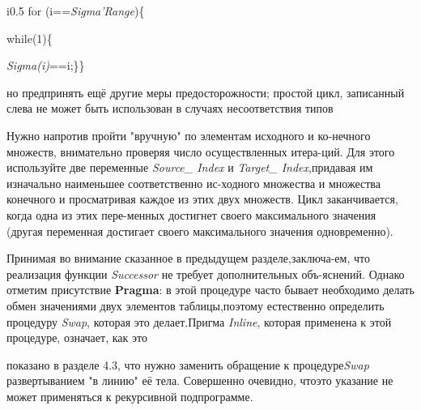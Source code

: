 \begin{wrapfigure}{i}{0.5\textwidth}
for (i==\textit{Sigma'Range})\{

   while(1)\{
   
   \textit{Sigma(i)}==i;\}\}
\end{wrapfigure}

  \noindent но предпринять ещё другие меры предосторожности; простой цикл, записанный слева не может быть использован в случаях несоответствия типов 

Нужно напротив пройти "вручную" по элементам исходного и ко-\linebreak нечного множеств, внимательно проверяя число осуществленных итера-\linebreak ций. Для этого используйте две переменные \textit{Source\_ Index} и \textit{Target\_ Index},\linebreak придавая им изначально наименьшее соответственно ис-\linebreak ходного множества и множества конечного и просматривая каждое из \linebreak этих двух множеств. Цикл заканчивается, когда одна из этих пере-\linebreak менных достигнет своего максимального значения (другая переменная \linebreak достигает своего максимального значения одновременно).\newline 

Принимая во внимание сказанное в предыдущем разделе,заключа-\linebreak ем, что реализация функции \textit{Successor} не требует дополнительных объ-\linebreak яснений. Однако отметим присутствие \textbf{Pragma}: в этой процедуре часто \linebreak бывает необходимо делать обмен значениями двух элементов таблицы,\linebreak поэтому естественно определить процедуру \textit{Swap}, которая это делает.\linebreak Пригма \textit{Inline}, которая применена к этой процедуре, означает, как это \newline 
\newpage

показано в разделе 4.3, что нужно заменить обращение к процедуре\linebreak \textit{Swap} развертыванием "в линию" её тела. Совершенно очевидно, что\linebreak это указание не может применяться к рекурсивной подпрограмме. 

